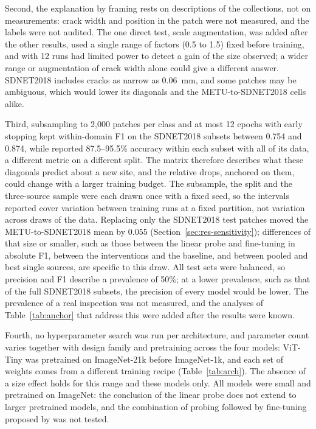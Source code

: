 \documentclass[pdflatex,sn-apa]{sn-jnl}
\begin{document}
Second, the explanation by framing rests on descriptions of the collections, not on measurements: crack width and position in the patch were not measured, and the labels were not audited. The one direct test, scale augmentation, was added after the other results, used a single range of factors (0.5 to 1.5) fixed before training, and with 12 runs had limited power to detect a gain of the size observed; a wider range or augmentation of crack width alone could give a different answer. SDNET2018 includes cracks as narrow as 0.06~mm, and some patches may be ambiguous, which would lower its diagonals and the METU-to-SDNET2018 cells alike.

Third, subsampling to 2,000 patches per class and at most 12 epochs with early stopping kept within-domain F1 on the SDNET2018 subsets between 0.754 and 0.874, while \citet{dorafshan2018sdnet} reported 87.5--95.5\% accuracy within each subset with all of its data, a different metric on a different split. The matrix therefore describes what these diagonals predict about a new site, and the relative drops, anchored on them, could change with a larger training budget. The subsample, the split and the three-source sample were each drawn once with a fixed seed, so the intervals reported cover variation between training runs at a fixed partition, not variation across draws of the data. Replacing only the SDNET2018 test patches moved the METU-to-SDNET2018 mean by 0.055 (Section~\ref{sec:res-sensitivity}); differences of that size or smaller, such as those between the linear probe and fine-tuning in absolute F1, between the interventions and the baseline, and between pooled and best single sources, are specific to this draw. All test sets were balanced, so precision and F1 describe a prevalence of 50\%; at a lower prevalence, such as that of the full SDNET2018 subsets, the precision of every model would be lower. The prevalence of a real inspection was not measured, and the analyses of Table~\ref{tab:anchor} that address this were added after the results were known.

Fourth, no hyperparameter search was run per architecture, and parameter count varies together with design family and pretraining across the four models: ViT-Tiny was pretrained on ImageNet-21k before ImageNet-1k, and each set of weights comes from a different training recipe (Table~\ref{tab:arch}). The absence of a size effect holds for this range and these models only. All models were small and pretrained on ImageNet: the conclusion of the linear probe does not extend to larger pretrained models, and the combination of probing followed by fine-tuning proposed by \citet{kumar2022} was not tested.
\end{document}

